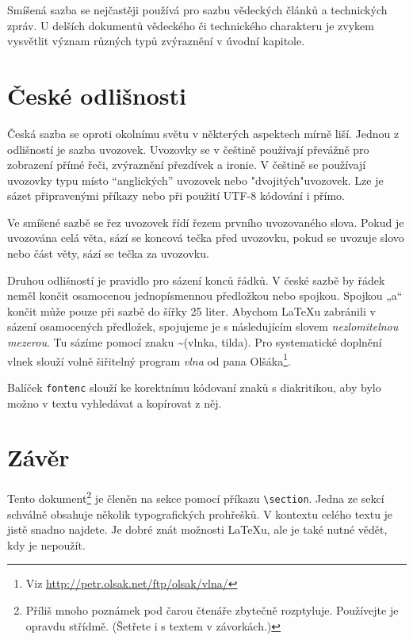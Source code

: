 \documentclass[twocolumn]{article}
\begin{document}
    \par
    Smíšená sazba se nejčastěji používá pro sazbu vědeckých článků a technických zpráv. U delších dokumentů
    vědeckého či technického charakteru je zvykem vysvětlit význam různých typů zvýraznění v úvodní kapitole.
    
    \section{České odlišnosti}
    Česká sazba se oproti okolnímu světu v některých
    aspektech mírně liší. Jednou z odlišností je sazba uvozovek. Uvozovky se v češtině používají převážně pro
    zobrazení přímé řeči, zvýraznění přezdívek a ironie.
    V češtině se používají uvozovky typu  místo ``anglických'' uvozovek nebo "dvojitých"uvozovek. Lze je
    sázet připravenými příkazy nebo při použití UTF-8 kódování i přímo.
    
    \par
    Ve smíšené sazbě se řez uvozovek řídí řezem prvního
    uvozovaného slova. Pokud je uvozována celá věta, sází
    se koncová tečka před uvozovku, pokud se uvozuje slovo
    nebo část věty, sází se tečka za uvozovku.
    
    \par
    Druhou odlišností je pravidlo pro sázení konců
    řádků. V české sazbě by řádek neměl končit osamocenou jednopísmennou předložkou nebo spojkou. Spojkou „a“ končit může pouze při sazbě do šířky 25 liter. Abychom \LaTeX u zabránili v sázení osamocených
    předložek, spojujeme je s následujícím slovem \emph{nezlomitelnou mezerou}. Tu sázíme pomocí znaku \textasciitilde  (vlnka,
    tilda). Pro systematické doplnění vlnek slouží volně šiřitelný program \emph{vlna} od pana Olšáka\footnote{Viz \url{http://petr.olsak.net/ftp/olsak/vlna/}}.
    
    \par
    Balíček \verb|fontenc| slouží ke korektnímu kódovaní
    znaků s diakritikou, aby bylo možno v textu vyhledávat
    a kopírovat z něj.
    
    
    \section{Závěr}
    Tento dokument\footnote{Příliš mnoho poznámek pod čarou čtenáře zbytečně rozptyluje. Používejte je opravdu střídmě. (Šetřete i s textem v závorkách.)} je členěn na sekce pomocí příkazu
    \verb|\section|. Jedna ze sekcí schválně obsahuje několik
    typografických prohřešků. V kontextu celého textu je
    jistě snadno najdete. Je dobré znát možnosti \LaTeX u,
    ale je také nutné vědět, kdy je nepoužít.
\end{document}
